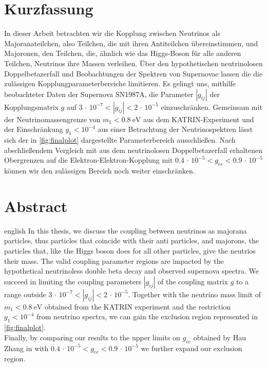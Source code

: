 \thispagestyle{plain}

\section*{Kurzfassung}
In dieser Arbeit betrachten wir die Kopplung zwischen Neutrinos als Majoranateilchen, also Teilchen, die mit ihren Antiteilchen übereinstimmen, und Majoronen, den Teilchen, die,
ähnlich wie das Higgs-Boson für alle anderen Teilchen, Neutrinos ihre Massen verleihen.
Über den hypothetischen neutrinolosen Doppelbetazerfall und Beobachtungen der Spektren von Supernovae lassen die die zulässigen Kopplungparameterbereiche limitieren.
Es gelingt uns, mithilfe beobachteter Daten der Supernova SN1987A, die Parameter $|g_{i j}|$ der Kopplungsmatrix $g$ auf $3 \, \cdot \, 10^{-7} < |g_{i j}| < 2 \, \cdot \, 10^{-5}$ einzuschränken.
Gemeinsam mit der Neutrinomassengrenze von $m_1 < \SI{0.8}{\eV}$ aus dem KATRIN-Experiment und der Einschränkung $g_1 < 10^{-4}$ aus einer Betrachtung der Neutrinospektren lässt sich der in \autoref{fig:finalplot}
dargestellte Parameterbereich ausschließen. 
Nach abschließendem Vergleich mit aus dem neutrinolosen Doppelbetazerfall erhaltenen Obergrenzen auf die Elektron-Elektron-Kopplung mit $\num{0.4} \, \cdot \, 10^{-5} < g_{ee} < \num{0.9} \, \cdot \, 10^{-5}$ können wir den
zulässigen Bereich noch weiter einschränken.

\section*{Abstract}
\begin{foreignlanguage}{english}
In this thesis, we discuss the coupling between neutrinos as majorana particles, thus particles that coincide with their anti particles, and majorons, the particles that, like the Higgs boson does for all other
particles, give the neutrios their mass.
The valid coupling parameter regions are impacted by the hypothetical neutrinoless double beta decay and observed supernova spectra.
We succeed in limiting the coupling parameters $|g_{i j}|$ of the coupling matrix $g$ to a range outside $3 \, \cdot \, 10^{-7} < |g_{i j}| < 2 \, \cdot \, 10^{-5}$.
Together with the neutrino mass limit of $m_1 < \SI{0.8}{\eV}$ obtained from the KATRIN experiment and the restriction $g_1 < 10^{-4}$ from neutrino spectra, we can gain the exclusion region represented in
\autoref{fig:finalplot}. \\
Finally, by comparing our results to the upper limits on $g_{ee}$ obtained by Hau Zhang in \cite{hauhau} with $\num{0.4} \, \cdot \, 10^{-5} < g_{ee} < \num{0.9} \, \cdot \, 10^{-5}$ we further expand our exclusion region.

\end{foreignlanguage}
